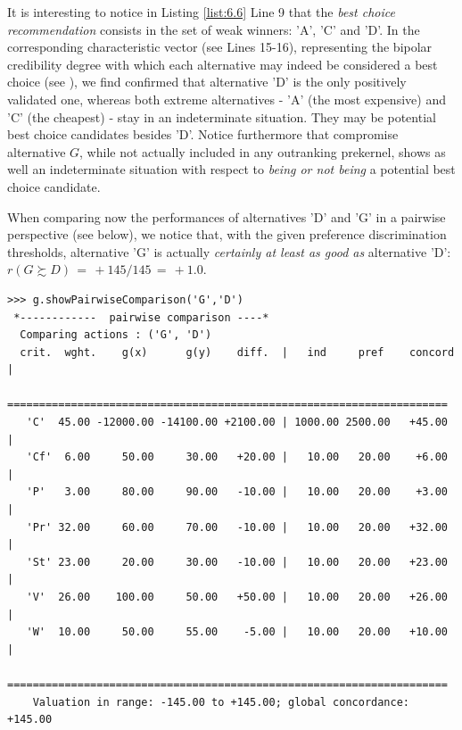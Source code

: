 It is interesting to notice in Listing \ref{list:6.6} Line 9 that the \emph{best choice recommendation} consists in the set of weak \Condorcet winners: 'A', 'C' and 'D'. In the corresponding characteristic vector (see Lines 15-16), representing the bipolar credibility degree with which each alternative may indeed be considered a best choice (see \citet{BIS-2006a,BIS-2006b}), we find confirmed that alternative 'D' is the only positively validated one, whereas both extreme alternatives - 'A' (the most expensive) and 'C' (the cheapest) - stay in an indeterminate situation. They may be potential best choice candidates besides 'D'. Notice furthermore that compromise alternative $G$, while not actually included in any outranking prekernel, shows as well an indeterminate situation with respect to \emph{being or not being} a potential best choice candidate.

When comparing now the performances of alternatives 'D' and 'G' in a pairwise perspective (see below), we notice that, with the given preference discrimination thresholds, alternative 'G' is actually \emph{certainly at least as good as} alternative 'D':  $r(G \succsim D)\, = \, +145/145\, =\, +1.0$.
\begin{lstlisting}[caption={Inspecting pairwise comparisons},label=list:6.5,basicstyle=\scriptsize]
>>> g.showPairwiseComparison('G','D')
 *------------  pairwise comparison ----*
  Comparing actions : ('G', 'D')
  crit.  wght.    g(x)      g(y)    diff.  |   ind     pref    concord 	|
   =====================================================================
   'C'  45.00 -12000.00 -14100.00 +2100.00 | 1000.00 2500.00   +45.00 	| 
   'Cf'  6.00     50.00     30.00   +20.00 |   10.00   20.00    +6.00 	| 
   'P'   3.00     80.00     90.00   -10.00 |   10.00   20.00    +3.00 	| 
   'Pr' 32.00     60.00     70.00   -10.00 |   10.00   20.00   +32.00 	| 
   'St' 23.00     20.00     30.00   -10.00 |   10.00   20.00   +23.00 	| 
   'V'  26.00    100.00     50.00   +50.00 |   10.00   20.00   +26.00 	| 
   'W'  10.00     50.00     55.00    -5.00 |   10.00   20.00   +10.00 	|
   =====================================================================
    Valuation in range: -145.00 to +145.00; global concordance: +145.00
\end{lstlisting}

